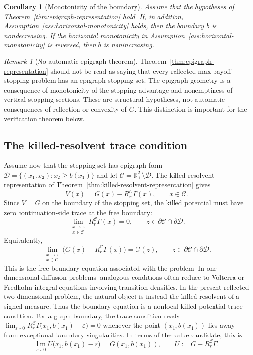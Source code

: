 \documentclass[pdflatex,sn-mathphys-num]{sn-jnl}
\theoremstyle{plain}
\newtheorem{corollary}[theorem]{Corollary}
\theoremstyle{definition}
\theoremstyle{remark}
\newtheorem{remark}[theorem]{Remark}
\numberwithin{equation}{section}
\begin{document}
\begin{corollary}[Monotonicity of the boundary] \label{cor:boundary-monotonicity} 
Assume that the hypotheses of Theorem~\ref{thm:epigraph-representation} hold. If, in addition, Assumption~\ref{ass:horizontal-monotonicity} holds, then the boundary \(b\) is nondecreasing. If the horizontal monotonicity in Assumption~\ref{ass:horizontal-monotonicity} is reversed, then \(b\) is nonincreasing. 
\end{corollary} 

\begin{remark}[No automatic epigraph theorem] \label{rem:no-automatic-epigraph} 
Theorem~\ref{thm:epigraph-representation} should not be read as saying that every reflected max-payoff stopping problem has an epigraph stopping set. The epigraph geometry is a consequence of monotonicity of the stopping advantage and nonemptiness of vertical stopping sections. These are structural hypotheses, not automatic consequences of reflection or convexity of \(G\). This distinction is important for the verification theorem below. \end{remark} 

\subsection{The killed-resolvent trace condition} \label{subsec:killed-trace-condition} 

Assume now that the stopping set has epigraph form 
$\displaystyle \mathcal D=\{(x_1,x_2):x_2\ge b(x_1)\}$ and let 
$\displaystyle \mathcal C=\mathbb R_+^2\setminus\mathcal D$. 
The killed-resolvent representation of Theorem~\ref{thm:killed-resolvent-representation} gives \[ V(x)=G(x)-R_r^{\mathcal C}\Gamma(x), \qquad x\in\mathcal C. \] Since \(V=G\) on the boundary of the stopping set, the killed potential must have zero continuation-side trace at the free boundary: 
\begin{equation} \label{eq:true-trace-condition} 
\lim_{\substack{x\to z\\ x\in\mathcal C}} R_r^{\mathcal C}\Gamma(x)=0, \qquad z\in\partial\mathcal C\cap\partial\mathcal D . 
\end{equation} 
Equivalently, 
\[
\lim_{\substack{x\to z\\ x\in\mathcal C}} \big(G(x)-R_r^{\mathcal C}\Gamma(x)\big) = G(z), \qquad z\in\partial\mathcal C\cap\partial\mathcal D.
\] 
This is the free-boundary equation associated with the problem. In one-dimensional diffusion problems, analogous conditions often reduce to Volterra or Fredholm integral equations involving transition densities. In the present reflected two-dimensional problem, the natural object is instead the killed resolvent of a signed measure. Thus the boundary equation is a nonlocal killed-potential trace condition. For a graph boundary, the trace condition reads 
$\displaystyle \lim_{\varepsilon\downarrow0} R_r^{\mathcal C}\Gamma \big(x_1,b(x_1)-\varepsilon\big) = 0$ 
whenever the point \((x_1,b(x_1))\) lies away from exceptional boundary singularities. In terms of the value candidate, this is 
\[
\lim_{\varepsilon\downarrow0} U\big(x_1,b(x_1)-\varepsilon\big) = G(x_1,b(x_1)), \qquad U:=G-R_r^{\mathcal C}\Gamma . 
\]
\end{document}
